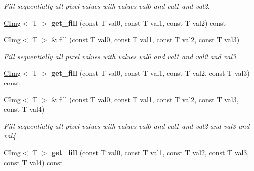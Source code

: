 \begin{DoxyCompactItemize}
\begin{DoxyCompactList}\small\item\em Fill sequentially all pixel values with values {\itshape val0\/} and {\itshape val1\/} and {\itshape val2\/}. \item\end{DoxyCompactList}\item 
\hypertarget{structcimg__library_1_1CImg_a529a242cfece2f3a36fc2b014a62ffcf}{
\hyperlink{structcimg__library_1_1CImg}{CImg}$<$ T $>$ {\bfseries get\_\-fill} (const T val0, const T val1, const T val2) const }
\label{structcimg__library_1_1CImg_a529a242cfece2f3a36fc2b014a62ffcf}

\item 
\hypertarget{structcimg__library_1_1CImg_a9bd6346aafacc83a623bbee841b2f590}{
\hyperlink{structcimg__library_1_1CImg}{CImg}$<$ T $>$ \& \hyperlink{structcimg__library_1_1CImg_a9bd6346aafacc83a623bbee841b2f590}{fill} (const T val0, const T val1, const T val2, const T val3)}
\label{structcimg__library_1_1CImg_a9bd6346aafacc83a623bbee841b2f590}

\begin{DoxyCompactList}\small\item\em Fill sequentially all pixel values with values {\itshape val0\/} and {\itshape val1\/} and {\itshape val2\/} and {\itshape val3\/}. \item\end{DoxyCompactList}\item 
\hypertarget{structcimg__library_1_1CImg_ae3043c5366b91e0d4a5d7fdbf2c208ae}{
\hyperlink{structcimg__library_1_1CImg}{CImg}$<$ T $>$ {\bfseries get\_\-fill} (const T val0, const T val1, const T val2, const T val3) const }
\label{structcimg__library_1_1CImg_ae3043c5366b91e0d4a5d7fdbf2c208ae}

\item 
\hypertarget{structcimg__library_1_1CImg_a7cb799be5da87f703ac3c949701c98de}{
\hyperlink{structcimg__library_1_1CImg}{CImg}$<$ T $>$ \& \hyperlink{structcimg__library_1_1CImg_a7cb799be5da87f703ac3c949701c98de}{fill} (const T val0, const T val1, const T val2, const T val3, const T val4)}
\label{structcimg__library_1_1CImg_a7cb799be5da87f703ac3c949701c98de}

\begin{DoxyCompactList}\small\item\em Fill sequentially all pixel values with values {\itshape val0\/} and {\itshape val1\/} and {\itshape val2\/} and {\itshape val3\/} and {\itshape val4\/}. \item\end{DoxyCompactList}\item 
\hypertarget{structcimg__library_1_1CImg_aa78cc959547810c62a0ff778d807478f}{
\hyperlink{structcimg__library_1_1CImg}{CImg}$<$ T $>$ {\bfseries get\_\-fill} (const T val0, const T val1, const T val2, const T val3, const T val4) const }
\label{structcimg__library_1_1CImg_aa78cc959547810c62a0ff778d807478f}


\end{DoxyCompactItemize}
